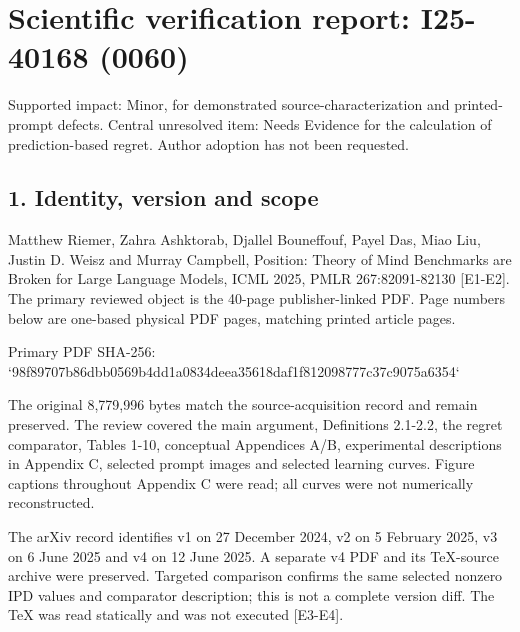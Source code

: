\documentclass[10pt]{article}
\begin{document}
\section*{Scientific verification report: I25-40168 (0060)}
Supported impact: Minor, for demonstrated source-characterization and printed-prompt defects. Central unresolved item: Needs Evidence for the calculation of prediction-based regret. Author adoption has not been requested.\par
\subsection*{1. Identity, version and scope}
Matthew Riemer, Zahra Ashktorab, Djallel Bouneffouf, Payel Das, Miao Liu, Justin D. Weisz and Murray Campbell, Position: Theory of Mind Benchmarks are Broken for Large Language Models, ICML 2025, PMLR 267:82091-82130 [E1-E2]. The primary reviewed object is the 40-page publisher-linked PDF. Page numbers below are one-based physical PDF pages, matching printed article pages.\par
Primary PDF SHA-256:
`98f89707b86dbb0569b4dd1a0834deea35618daf1f812098777c37c9075a6354`\par
The original 8,779,996 bytes match the source-acquisition record and remain preserved. The review covered the main argument, Definitions 2.1-2.2, the regret comparator, Tables 1-10, conceptual Appendices A/B, experimental descriptions in Appendix C, selected prompt images and selected learning curves. Figure captions throughout Appendix C were read; all curves were not numerically reconstructed.\par
The arXiv record identifies v1 on 27 December 2024, v2 on 5 February 2025, v3 on 6 June 2025 and v4 on 12 June 2025. A separate v4 PDF and its TeX-source archive were preserved. Targeted comparison confirms the same selected nonzero IPD values and comparator description; this is not a complete version diff. The TeX was read statically and was not executed [E3-E4].\par
\end{document}
